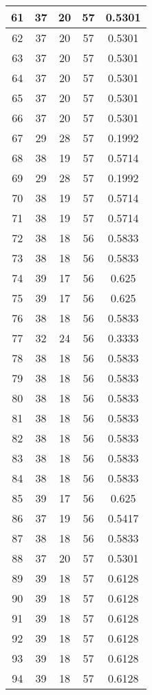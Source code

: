 \documentclass[letterpaper, 12pt]{article}
\begin{document}
\begin{longtable}{|c|c|c|c|c|}
\hline
61 & 37 & 20 & 57 & 0.5301 \\
\hline
62 & 37 & 20 & 57 & 0.5301 \\
\hline
63 & 37 & 20 & 57 & 0.5301 \\
\hline
64 & 37 & 20 & 57 & 0.5301 \\
\hline
65 & 37 & 20 & 57 & 0.5301 \\
\hline
66 & 37 & 20 & 57 & 0.5301 \\
\hline
67 & 29 & 28 & 57 & 0.1992 \\
\hline
68 & 38 & 19 & 57 & 0.5714 \\
\hline
69 & 29 & 28 & 57 & 0.1992 \\
\hline
70 & 38 & 19 & 57 & 0.5714 \\
\hline
71 & 38 & 19 & 57 & 0.5714 \\
\hline
72 & 38 & 18 & 56 & 0.5833 \\
\hline
73 & 38 & 18 & 56 & 0.5833 \\
\hline
74 & 39 & 17 & 56 & 0.625 \\
\hline
75 & 39 & 17 & 56 & 0.625 \\
\hline
76 & 38 & 18 & 56 & 0.5833 \\
\hline
77 & 32 & 24 & 56 & 0.3333 \\
\hline
78 & 38 & 18 & 56 & 0.5833 \\
\hline
79 & 38 & 18 & 56 & 0.5833 \\
\hline
80 & 38 & 18 & 56 & 0.5833 \\
\hline
81 & 38 & 18 & 56 & 0.5833 \\
\hline
82 & 38 & 18 & 56 & 0.5833 \\
\hline
83 & 38 & 18 & 56 & 0.5833 \\
\hline
84 & 38 & 18 & 56 & 0.5833 \\
\hline
85 & 39 & 17 & 56 & 0.625 \\
\hline
86 & 37 & 19 & 56 & 0.5417 \\
\hline
87 & 38 & 18 & 56 & 0.5833 \\
\hline
88 & 37 & 20 & 57 & 0.5301 \\
\hline
89 & 39 & 18 & 57 & 0.6128 \\
\hline
90 & 39 & 18 & 57 & 0.6128 \\
\hline
91 & 39 & 18 & 57 & 0.6128 \\
\hline
92 & 39 & 18 & 57 & 0.6128 \\
\hline
93 & 39 & 18 & 57 & 0.6128 \\
\hline
94 & 39 & 18 & 57 & 0.6128 \\

\end{longtable}
\end{document}
